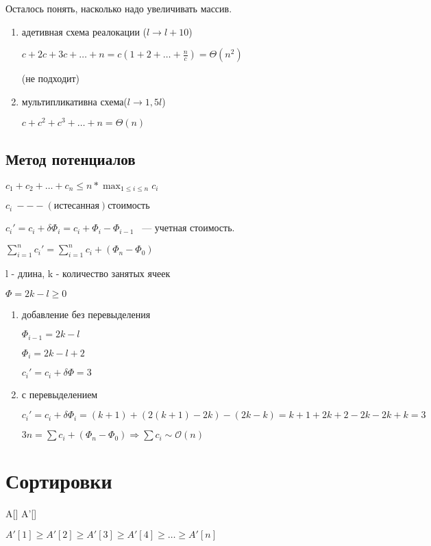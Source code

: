 \documentclass[12pt]{article}
\def\O{\mathcal{O}}
\begin{document}
Осталось понять, насколько надо увеличивать массив.

\begin{enumerate}
\item
адетивная схема реалокации ($l \to l + 10$)

$c + 2c + 3c +\ldots + n = c(1 + 2 + \ldots + \frac{n}{c}) = \Theta(n^2)$

(не подходит)

\item
мультипликативна схема($l \to 1,5 l$) 

$c + c^2 + c^3 + \ldots + n = \Theta(n)$
\end{enumerate}

\subsection{Метод потенциалов}

$c_1 + c_2 + \ldots + c_n \le n * \max_{1 \le i \le n} c_i$

$c_i ~--- (истесанная) стоимость$

$c_i' = c_i + \delta \Phi_i = c_i + \Phi_i - \Phi_{i - 1}$ ~--- учетная стоимость.

$\sum_{i = 1}^{n}c_i' = \sum^{n}_{i = 1}c_i + (\Phi_n - \Phi_0)$

l - длина, k - количество занятых ячеек

$\Phi = 2k - l \ge 0$

\begin{enumerate}
\item добавление без перевыделения 

$\Phi_{i - 1} = 2k - l$

$\Phi_{i} = 2k - l + 2$

$c_i' = c_i + \delta\Phi = 3$

\item с перевыделением 

$c_i' = c_i + \delta \Phi_i = (k + 1) + (2(k + 1) - 2k) - (2k - k) = k + 1 + 2k + 2 - 2k - 2k + k = 3$

$3n = \sum c_i + (\Phi_n - \Phi_0) \Rightarrow \sum c_i \sim \O(n)$
\end{enumerate}

\section{Сортировки}

A[]
A'[]

$A'[1] \ge A'[2] \ge A'[3] \ge A'[4] \ge \ldots \ge A'[n]$
\end{document}
